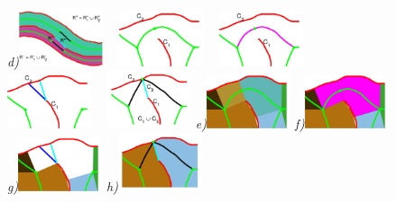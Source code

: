 \begin{figure}[!ht]
{\footnotesize\textit{d)}}\includegraphics[width=0.22\textwidth]{figs/lsc_eight_step_a.pdf}
{\footnotesize\textit{\textcolor{white}{a)}}}\includegraphics[width=0.22\textwidth]{figs/lsc_gap4_l1.pdf} 
{\footnotesize\textit{\textcolor{white}{a)}}}\includegraphics[width=0.22\textwidth]{figs/lsc_gap4_l2.pdf} 
{\footnotesize\textit{\textcolor{white}{a)}}}\includegraphics[width=0.22\textwidth]{figs/lsc_gap4_l3.pdf}
{\footnotesize\textit{\textcolor{white}{a)}}}\includegraphics[width=0.22\textwidth]{figs/lsc_gap4_l4.pdf}
{\footnotesize\textit{e)}}\includegraphics[width=0.22\textwidth]{figs/lsc_gap4_l5.pdf}
{\footnotesize\textit{f)}}\includegraphics[width=0.22\textwidth]{figs/lsc_gap4_l6.pdf}
{\footnotesize\textit{g)}}\includegraphics[width=0.22\textwidth]{figs/lsc_gap4_l7.pdf}
{\footnotesize\textit{h)}}\includegraphics[width=0.22\textwidth]{figs/lsc_gap4_l8.pdf}


\end{figure}
